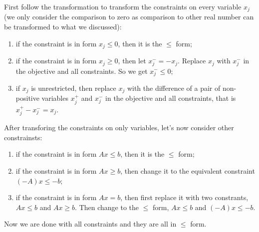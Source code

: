 First follow the transformation to transform the constraints on every variable $x_j$ (we only consider the comparison to zero as comparison to other real number can be transformed to what we discussed):

\begin{enumerate}
\item if the constraint is in form $x_j \leq 0 $, then it is the $\leq$ form;
\item if the constraint is in form $x_j \geq 0 $, then let $x_j^- = - x_j$. Replace $x_j$ with $x_j^-$ in the objective and all constraints. So we get $x_j^- \leq 0$;
\item if $x_j$ is unrestricted, then replace $x_j$ with the difference of a pair of non-positive variables $x_j^+$ and $x_j^-$ in the objective and all constraints, that is $x_j^+-x_j^- = x_j$.
\end{enumerate}

After transforing the constraints on only variables, let's now consider other constrainsts:

\begin{enumerate}
\item if the constraint is in form $Ax \leq b$, then it is the $\leq$ form;
\item if the constraint is in form $Ax \geq b$, then change it to the equivalent constraint $(-A)x \leq -b$;
\item if the constraint is in form $Ax = b$, then first replace it with two constrants, $Ax \leq b$ and $Ax \geq b$. Then change to the $\leq$ form, $Ax \leq b$ and $(-A)x \leq -b$.
\end{enumerate}

Now we are done with all constraints and they are all in $\leq$ form.